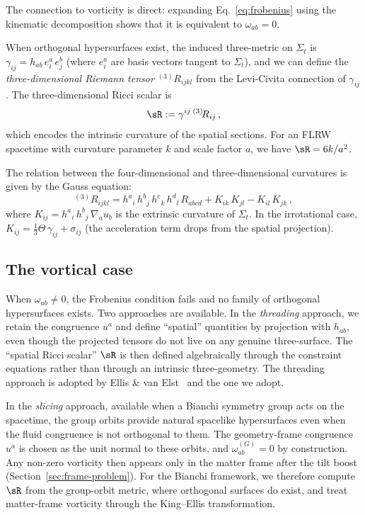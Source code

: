 \noindent
The connection to vorticity is direct: expanding
Eq.~\eqref{eq:frobenius} using the kinematic decomposition
shows that it is equivalent to $\omega_{ab} = 0$.

When orthogonal hypersurfaces exist, the induced three-metric
on $\Sigma_t$ is $\gamma_{ij} = h_{ab}\,e^a_i\,e^b_j$
(where $e^a_i$ are basis vectors tangent to $\Sigma_t$), and
we can define the \emph{three-dimensional Riemann tensor}
${}^{(3)}\!R_{ijkl}$ from the Levi-Civita connection of
$\gamma_{ij}$.  The three-dimensional Ricci scalar is
\begin{equation}\label{eq:3Ricci}
\sR := \gamma^{ij}\,{}^{(3)}\!R_{ij}\,,
\end{equation}
which encodes the intrinsic curvature of the spatial sections.
For an FLRW spacetime with curvature parameter $k$ and scale
factor $a$, we have $\sR = 6k/a^2$.

The relation between the four-dimensional and
three-dimensional curvatures is given by the Gauss equation:
\begin{equation}\label{eq:gauss}
{}^{(3)}\!R_{ijkl}
= h^a{}_i\,h^b{}_j\,h^c{}_k\,h^d{}_l\,R_{abcd}
  + K_{ik}\,K_{jl} - K_{il}\,K_{jk}\,,
\end{equation}
where $K_{ij} = h^a{}_i\,h^b{}_j\,\nabla_a u_b$ is the
extrinsic curvature of $\Sigma_t$.  In the irrotational case,
$K_{ij} = \frac{1}{3}\Theta\,\gamma_{ij} + \sigma_{ij}$
(the acceleration term drops from the spatial projection).


\subsection{The vortical case}\label{sec:vort-spatial}

When $\omega_{ab} \neq 0$, the Frobenius condition fails and
no family of orthogonal hypersurfaces exists.  Two approaches
are available.  In the \emph{threading} approach, we retain
the congruence $u^a$ and define ``spatial'' quantities by
projection with $h_{ab}$, even though the projected tensors do
not live on any genuine three-surface.  The ``spatial Ricci
scalar'' $\sR$ is then defined algebraically through the
constraint equations rather than through an intrinsic
three-geometry.  The threading approach is adopted by Ellis \& van
Elst~\cite{EllisVanElst1999} and the one we adopt.

In the \emph{slicing} approach, available when a Bianchi
symmetry group acts on the spacetime, the group orbits
provide natural spacelike hypersurfaces even when the fluid
congruence is not orthogonal to them.  The geometry-frame
congruence $u^a$ is chosen as the unit normal to these orbits,
and $\omega_{ab}^{(G)} = 0$ by construction.  Any non-zero
vorticity then appears only in the matter frame after the tilt
boost (Section~\ref{sec:frame-problem}).  For the Bianchi
framework, we therefore compute $\sR$ from the group-orbit
metric, where orthogonal surfaces do exist, and treat
matter-frame vorticity through the King--Ellis
transformation.



